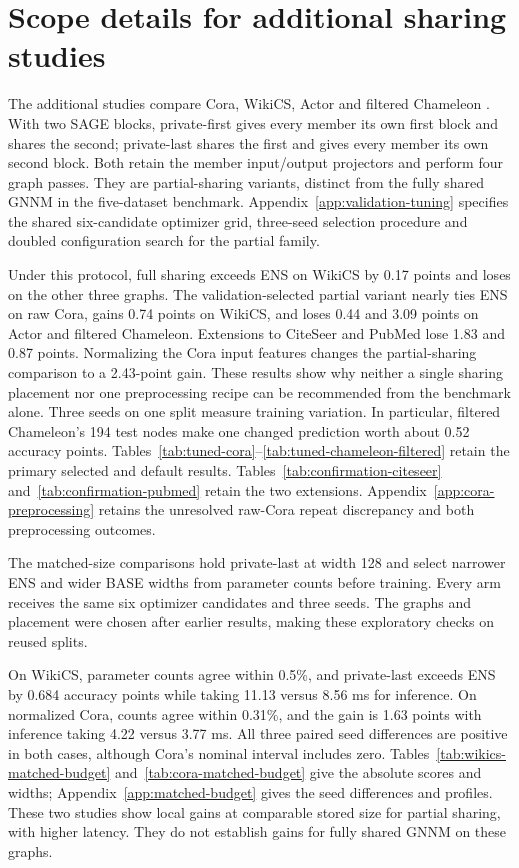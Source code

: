 \section{Scope details for additional sharing studies}\label{app:sharing-scope-summary}
The additional studies compare Cora, WikiCS, Actor and filtered Chameleon \citep{yang2016revisiting,mernyei2020wikics,pei2020geomgcn,platonov2023critical}. With two SAGE blocks, private-first gives every member its own first block and shares the second; private-last shares the first and gives every member its own second block. Both retain the member input/output projectors and perform four graph passes. They are partial-sharing variants, distinct from the fully shared GNNM in the five-dataset benchmark. Appendix~\ref{app:validation-tuning} specifies the shared six-candidate optimizer grid, three-seed selection procedure and doubled configuration search for the partial family.

Under this protocol, full sharing exceeds ENS on WikiCS by 0.17 points and loses on the other three graphs. The validation-selected partial variant nearly ties ENS on raw Cora, gains 0.74 points on WikiCS, and loses 0.44 and 3.09 points on Actor and filtered Chameleon. Extensions to CiteSeer and PubMed lose 1.83 and 0.87 points. Normalizing the Cora input features changes the partial-sharing comparison to a 2.43-point gain. These results show why neither a single sharing placement nor one preprocessing recipe can be recommended from the benchmark alone. Three seeds on one split measure training variation. In particular, filtered Chameleon's 194 test nodes make one changed prediction worth about 0.52 accuracy points. Tables~\ref{tab:tuned-cora}--\ref{tab:tuned-chameleon-filtered} retain the primary selected and default results. Tables~\ref{tab:confirmation-citeseer} and~\ref{tab:confirmation-pubmed} retain the two extensions. Appendix~\ref{app:cora-preprocessing} retains the unresolved raw-Cora repeat discrepancy and both preprocessing outcomes.

The matched-size comparisons hold private-last at width 128 and select narrower ENS and wider BASE widths from parameter counts before training. Every arm receives the same six optimizer candidates and three seeds. The graphs and placement were chosen after earlier results, making these exploratory checks on reused splits.

On WikiCS, parameter counts agree within 0.5\%, and private-last exceeds ENS by 0.684 accuracy points while taking 11.13 versus 8.56 ms for inference. On normalized Cora, counts agree within 0.31\%, and the gain is 1.63 points with inference taking 4.22 versus 3.77 ms. All three paired seed differences are positive in both cases, although Cora's nominal interval includes zero. Tables~\ref{tab:wikics-matched-budget} and~\ref{tab:cora-matched-budget} give the absolute scores and widths; Appendix~\ref{app:matched-budget} gives the seed differences and profiles. These two studies show local gains at comparable stored size for partial sharing, with higher latency. They do not establish gains for fully shared GNNM on these graphs.

